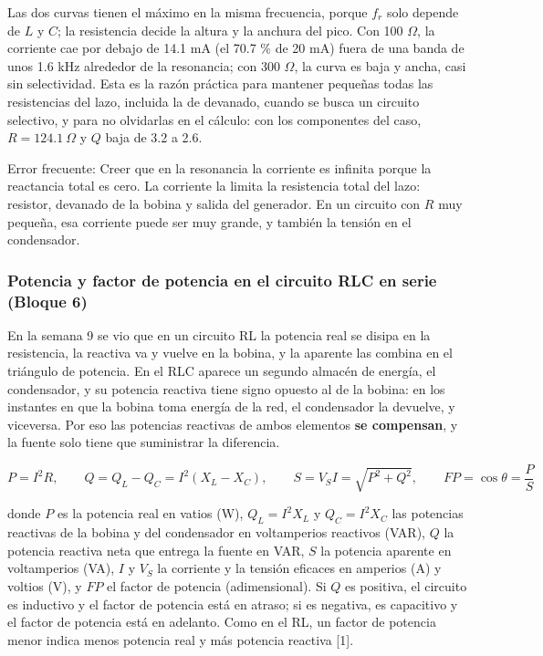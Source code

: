 \documentclass[11pt,letterpaper]{article}
\begin{document}
Las dos curvas tienen el máximo en la misma frecuencia, porque $f_r$ solo depende de $L$ y $C$; la resistencia decide la altura y la anchura del pico. Con 100 \ensuremath{\Omega}, la corriente cae por debajo de 14.1 mA (el 70.7 \% de 20 mA) fuera de una banda de unos 1.6 kHz alrededor de la resonancia; con 300 \ensuremath{\Omega}, la curva es baja y ancha, casi sin selectividad. Esta es la razón práctica para mantener pequeñas todas las resistencias del lazo, incluida la de devanado, cuando se busca un circuito selectivo, y para no olvidarlas en el cálculo: con los componentes del caso, $R = 124.1\ \Omega$ y $Q$ baja de 3.2 a 2.6.

\begin{nota}{Error frecuente:}
Creer que en la resonancia la corriente es infinita porque la reactancia total es cero. La corriente la limita la resistencia total del lazo: resistor, devanado de la bobina y salida del generador. En un circuito con $R$ muy pequeña, esa corriente puede ser muy grande, y también la tensión en el condensador.
\end{nota}

\subsubsection{Potencia y factor de potencia en el circuito RLC en serie (Bloque 6)}

En la semana 9 se vio que en un circuito RL la potencia real se disipa en la resistencia, la reactiva va y vuelve en la bobina, y la aparente las combina en el triángulo de potencia. En el RLC aparece un segundo almacén de energía, el condensador, y su potencia reactiva tiene signo opuesto al de la bobina: en los instantes en que la bobina toma energía de la red, el condensador la devuelve, y viceversa. Por eso las potencias reactivas de ambos elementos \textbf{se compensan}, y la fuente solo tiene que suministrar la diferencia.

\begin{equation}
  P = I^{2}R, \qquad Q = Q_L - Q_C = I^{2}(X_L - X_C), \qquad S = V_S I = \sqrt{P^{2} + Q^{2}}, \qquad FP = \cos\theta = \frac{P}{S}
\end{equation}

donde $P$ es la potencia real en vatios (W), $Q_L = I^2 X_L$ y $Q_C = I^2 X_C$ las potencias reactivas de la bobina y del condensador en voltamperios reactivos (VAR), $Q$ la potencia reactiva neta que entrega la fuente en VAR, $S$ la potencia aparente en voltamperios (VA), $I$ y $V_S$ la corriente y la tensión eficaces en amperios (A) y voltios (V), y $FP$ el factor de potencia (adimensional). Si $Q$ es positiva, el circuito es inductivo y el factor de potencia está en atraso; si es negativa, es capacitivo y el factor de potencia está en adelanto. Como en el RL, un factor de potencia menor indica menos potencia real y más potencia reactiva [1].
\end{document}
